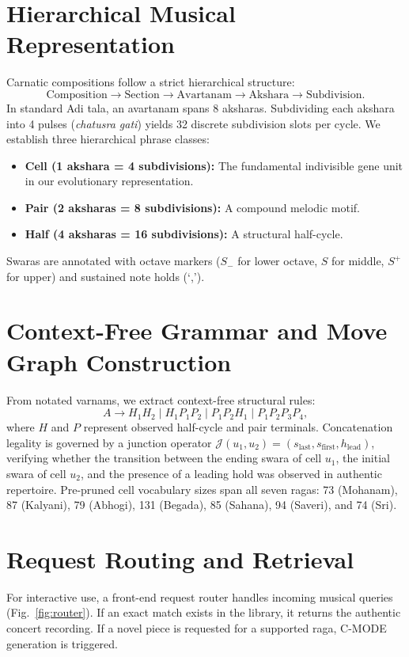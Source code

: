 \documentclass[12pt,a4paper]{report}
\begin{document}
\section{Hierarchical Musical Representation}
Carnatic compositions follow a strict hierarchical structure:
\begin{equation}
 \text{Composition} \rightarrow \text{Section} \rightarrow \text{Avartanam} \rightarrow \text{Akshara} \rightarrow \text{Subdivision}.
\end{equation}
In standard Adi tala, an avartanam spans 8 aksharas. Subdividing each akshara into 4 pulses (\textit{chatusra gati}) yields 32 discrete subdivision slots per cycle. We establish three hierarchical phrase classes:
\begin{itemize}
    \item \textbf{Cell (1 akshara = 4 subdivisions):} The fundamental indivisible gene unit in our evolutionary representation.
    \item \textbf{Pair (2 aksharas = 8 subdivisions):} A compound melodic motif.
    \item \textbf{Half (4 aksharas = 16 subdivisions):} A structural half-cycle.
\end{itemize}
Swaras are annotated with octave markers ($S_-$ for lower octave, $S$ for middle, $S^+$ for upper) and sustained note holds (`,').

\section{Context-Free Grammar and Move Graph Construction}
From notated varnams, we extract context-free structural rules:
\begin{equation}
 A \rightarrow H_1 H_2 \mid H_1 P_1 P_2 \mid P_1 P_2 H_1 \mid P_1 P_2 P_3 P_4,
\end{equation}
where $H$ and $P$ represent observed half-cycle and pair terminals. Concatenation legality is governed by a junction operator $\mathcal{J}(u_1, u_2) = (s_{\text{last}}, s_{\text{first}}, h_{\text{lead}})$, verifying whether the transition between the ending swara of cell $u_1$, the initial swara of cell $u_2$, and the presence of a leading hold was observed in authentic repertoire. Pre-pruned cell vocabulary sizes span all seven ragas: 73 (Mohanam), 87 (Kalyani), 79 (Abhogi), 131 (Begada), 85 (Sahana), 94 (Saveri), and 74 (Sri).

\section{Request Routing and Retrieval}
For interactive use, a front-end request router handles incoming musical queries (Fig.~\ref{fig:router}). If an exact match exists in the library, it returns the authentic concert recording. If a novel piece is requested for a supported raga, C-MODE generation is triggered.
\end{document}

